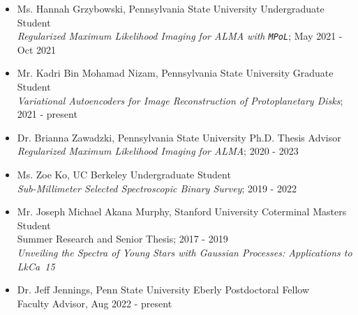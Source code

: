 \begin{itemize}
  \item Ms. Hannah Grzybowski, Pennsylvania State University Undergraduate Student \\ 
  \emph{Regularized Maximum Likelihood Imaging for ALMA with \texttt{MPoL}}; May 2021 - Oct 2021
  \item Mr. Kadri Bin Mohamad Nizam, Pennsylvania State University Graduate Student \\ 
  \emph{Variational Autoencoders for Image Reconstruction of Protoplanetary Disks}; 2021 - present
  \item Dr. Brianna Zawadzki, Pennsylvania State University Ph.D. Thesis Advisor \\
  \emph{Regularized Maximum Likelihood Imaging for ALMA}; 2020 - 2023
  \item Ms. Zoe Ko, UC Berkeley Undergraduate Student \\ 
  \emph{Sub-Millimeter Selected Spectroscopic Binary Survey}; 2019 - 2022 
  \item Mr. Joseph Michael Akana Murphy, Stanford University Coterminal Masters Student \\
  Summer Research and Senior Thesis; 2017 - 2019\\
  \emph{Unveiling the Spectra of Young Stars with Gaussian Processes: Applications to LkCa~15}
  \item Dr. Jeff Jennings, Penn State University Eberly Postdoctoral Fellow \\
  Faculty Advisor, Aug 2022 - present\\
\end{itemize}
